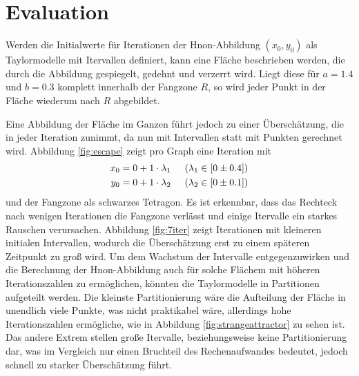 
\chapter{Evaluation}
\label{ch:Evaluierung}

Werden die Initialwerte für Iterationen der H\e non-Abbildung $(x_0, y_0)$ als Taylormodelle mit Itervallen definiert, kann eine Fläche beschrieben werden, die durch die Abbildung gespiegelt, gedehnt und verzerrt wird. Liegt diese für $a=1.4$ und $b=0.3$ komplett innerhalb der Fangzone $R$, so wird jeder Punkt in der Fläche wiederum nach $R$ abgebildet. 


Eine Abbildung der Fläche im Ganzen führt jedoch zu einer Überschätzung, die in jeder Iteration zunimmt, da nun mit Intervallen statt mit Punkten gerechnet wird. Abbildung \ref{fig:escape} zeigt pro Graph eine Iteration mit 
\begin{align*}
x_0 = 0 + 1 \cdot \lambda_1 & \hspace{0.5cm} (\lambda_1 \in [0 \pm 0.4]) \\
 y_0 = 0 + 1 \cdot \lambda_2 & \hspace{0.5cm} (\lambda_2 \in [0 \pm 0.1])
\end{align*}
und der Fangzone als schwarzes Tetragon. Es ist erkennbar, dass das Rechteck nach wenigen Iterationen die Fangzone verlässt und einige Itervalle ein starkes Rauschen verursachen. Abbildung \ref{fig:7iter} zeigt  Iterationen mit kleineren initialen Intervallen, wodurch die Überschätzung erst zu einem späteren Zeitpunkt zu groß wird. Um dem Wachstum der Intervalle entgegenzuwirken und die Berechnung der H\e non-Abbildung auch für solche Flächem mit höheren Iterationszahlen zu ermöglichen, könnten die Taylormodelle in Partitionen aufgeteilt werden.  Die kleinste Partitionierung wäre die Aufteilung der Fläche in unendlich viele Punkte, was nicht praktikabel wäre, allerdings hohe Iterationszahlen ermögliche, wie in Abbildung \ref{fig:strangeattractor} zu sehen ist. Das andere Extrem stellen große Itervalle, beziehungsweise keine Partitionierung dar, was im Vergleich nur einen Bruchteil des Rechenaufwandes bedeutet, jedoch schnell zu starker Überschätzung führt.

